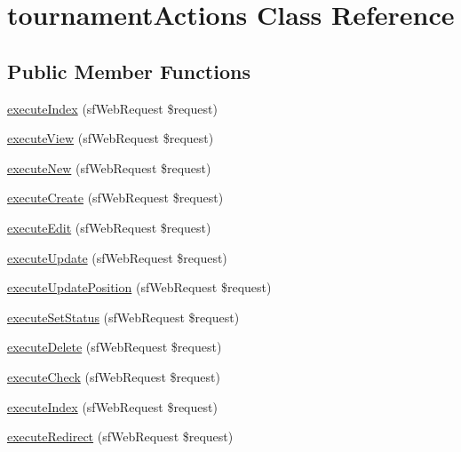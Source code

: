 \hypertarget{classtournament_actions}{\section{tournament\-Actions Class Reference}
\label{classtournament_actions}
}
\subsection*{Public Member Functions}
\begin{DoxyCompactItemize}
\item 
\hyperlink{classtournament_actions_a948cc911eb1d9f77990be54af3b2080f}{execute\-Index} (sf\-Web\-Request \$request)
\item 
\hyperlink{classtournament_actions_ad61d212fa3f7e8cb4190700a8a670606}{execute\-View} (sf\-Web\-Request \$request)
\item 
\hyperlink{classtournament_actions_a0ffbea56560c6c633dae68ec22aff21c}{execute\-New} (sf\-Web\-Request \$request)
\item 
\hyperlink{classtournament_actions_a75837617743fb64dca82d8133b2c662a}{execute\-Create} (sf\-Web\-Request \$request)
\item 
\hyperlink{classtournament_actions_af4d8fedd4b28f3398826a1bb8fa54394}{execute\-Edit} (sf\-Web\-Request \$request)
\item 
\hyperlink{classtournament_actions_af7b4f51862add3c2ebb54efc136a0840}{execute\-Update} (sf\-Web\-Request \$request)
\item 
\hyperlink{classtournament_actions_acae2fa1cffde05d8c0331ca062d5ee54}{execute\-Update\-Position} (sf\-Web\-Request \$request)
\item 
\hyperlink{classtournament_actions_a365ffe9a4c547cdb81d9e2131e7bd7b9}{execute\-Set\-Status} (sf\-Web\-Request \$request)
\item 
\hyperlink{classtournament_actions_a52b5b11b11a0070dd2662257520c045a}{execute\-Delete} (sf\-Web\-Request \$request)
\item 
\hyperlink{classtournament_actions_ac0c0ef022ff2f4d455829907cbcec1e8}{execute\-Check} (sf\-Web\-Request \$request)
\item 
\hyperlink{classtournament_actions_a948cc911eb1d9f77990be54af3b2080f}{execute\-Index} (sf\-Web\-Request \$request)
\item 
\hyperlink{classtournament_actions_a8ae69bb78141122dcb324bbe0fa7d8eb}{execute\-Redirect} (sf\-Web\-Request \$request)
\item 

\end{DoxyCompactItemize}

